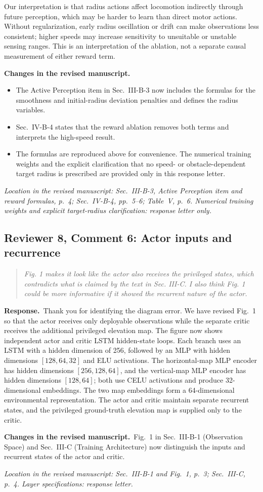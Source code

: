 \documentclass[11pt]{article}
\newenvironment{reviewcomment}{\begin{quote}\color{reviewblue}\itshape}{\end{quote}}
\newcommand{\Response}{\par\noindent\textbf{Response.}\ }
\newcommand{\Changes}{\par\noindent\textbf{Changes in the revised manuscript.}\ }
\newcommand{\Location}[1]{\par\noindent\textit{Location in the revised manuscript: #1}}
\begin{document}
Our interpretation is that radius actions affect locomotion indirectly through future perception, which may be harder to learn than direct motor actions. Without regularization, early radius oscillation or drift can make observations less consistent; higher speeds may increase sensitivity to unsuitable or unstable sensing ranges. This is an interpretation of the ablation, not a separate causal measurement of either reward term.
\Changes
\begin{itemize}
    \item The Active Perception item in Sec.~III-B-3 now includes the formulas for the smoothness and initial-radius deviation penalties and defines the radius variables.
    \item Sec.~IV-B-4 states that the reward ablation removes both terms and interprets the high-speed result.
    \item The formulas are reproduced above for convenience. The numerical training weights and the explicit clarification that no speed- or obstacle-dependent target radius is prescribed are provided only in this response letter.
\end{itemize}
\Location{Sec.~III-B-3, Active Perception item and reward formulas, p.~4; Sec.~IV-B-4, pp.~5--6; Table~V, p.~6. Numerical training weights and explicit target-radius clarification: response letter only.}



\subsection*{Reviewer 8, Comment 6: Actor inputs and recurrence}
\begin{reviewcomment}
Fig. 1 makes it look like the actor also receives the privileged states, which contradicts what is claimed by the text in Sec. III-C. I also think Fig. 1 could be more informative if it showed the recurrent nature of the actor.
\end{reviewcomment}
\Response Thank you for identifying the diagram error. We have revised Fig.~1 so that the actor receives only deployable observations while the separate critic receives the additional privileged elevation map. The figure now shows independent actor and critic LSTM hidden-state loops. Each branch uses an LSTM with a hidden dimension of 256, followed by an MLP with hidden dimensions $[128,64,32]$ and ELU activations. The horizontal-map MLP encoder has hidden dimensions $[256,128,64]$, and the vertical-map MLP encoder has hidden dimensions $[128,64]$; both use CELU activations and produce 32-dimensional embeddings. The two map embeddings form a 64-dimensional environmental representation. The actor and critic maintain separate recurrent states, and the privileged ground-truth elevation map is supplied only to the critic.
\Changes Fig.~1 in Sec.~III-B-1 (Observation Space) and Sec.~III-C (Training Architecture) now distinguish the inputs and recurrent states of the actor and critic.
\Location{Sec.~III-B-1 and Fig.~1, p.~3; Sec.~III-C, p.~4. Layer specifications: response letter.}
\end{document}
